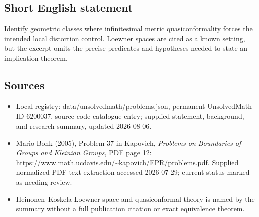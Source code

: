 \documentclass[11pt]{article}
\begin{document}
\subsection{Short English statement}
Identify geometric classes where infinitesimal metric quasiconformality forces the intended local distortion control. Loewner spaces are cited as a known setting, but the excerpt omits the precise predicates and hypotheses needed to state an implication theorem.
\subsection{Sources}
\begin{itemize}
\item Local registry: \url{data/unsolvedmath/problems.json}, permanent UnsolvedMath ID \(6200037\), source code catalogue entry; supplied statement, background, and research summary, updated 2026-08-06.
\item Mario Bonk (2005), Problem 37 in Kapovich, \emph{Problems on Boundaries of Groups and Kleinian Groups}, PDF page 12: \url{https://www.math.ucdavis.edu/~kapovich/EPR/problems.pdf}. Supplied normalized PDF-text extraction accessed 2026-07-29; current status marked as needing review.
\item Heinonen--Koskela Loewner-space and quasiconformal theory is named by the summary without a full publication citation or exact equivalence theorem.
\end{itemize}
\end{document}
